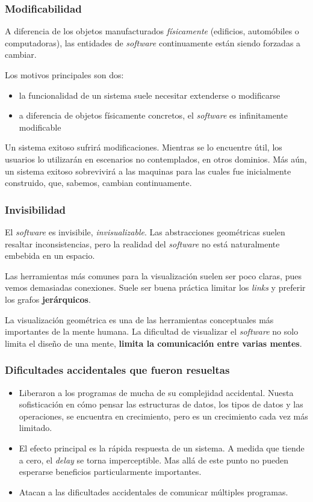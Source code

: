 \documentclass{beamer}
\begin{document}
\begin{frame}[fragile]
  \frametitle{Modificabilidad}
  A diferencia de los objetos manufacturados \textit{f\'isicamente} (edificios,
  autom\'obiles o computadoras), las entidades de \textit{software} continuamente
  est\'an siendo forzadas a cambiar.

  Los motivos principales son dos:
  \begin{itemize}
    \item la funcionalidad de un sistema suele necesitar extenderse o modificarse
    \item a diferencia de objetos f\'isicamente concretos, el \textit{software}
      es infinitamente modificable
  \end{itemize}

  Un sistema exitoso sufrir\'a modificaciones. Mientras se lo encuentre \'util,
  los usuarios lo utilizar\'an en escenarios no contemplados, en otros dominios.
  M\'as a\'un, un sistema exitoso sobrevivir\'a a las maquinas para las cuales
  fue inicialmente construido, que, sabemos, cambian continuamente.
\end{frame}


\begin{frame}[fragile]
  \frametitle{Invisibilidad}
  El \textit{software} es invisibile, \textit{invisualizable}.
  Las abstracciones geom\'etricas suelen resaltar inconsistencias, pero
  la realidad del \textit{software} no est\'a naturalmente embebida
  en un espacio.

  Las herramientas m\'as comunes para la visualizaci\'on suelen ser poco claras,
  pues vemos demasiadas conexiones. Suele ser buena pr\'actica limitar los
  \textit{links} y preferir los grafos \textbf{jer\'arquicos}.

  La visualizaci\'on geom\'etrica es una de las herramientas conceptuales m\'as
  importantes de la mente humana. La dificultad de visualizar el \textit{software}
  no solo limita el dise\~no de una mente, \textbf{limita la comunicaci\'on entre
  varias mentes}.
\end{frame}


\begin{frame}[fragile]
  \frametitle{Dificultades accidentales que fueron resueltas}

  \begin{itemize}
    \item[Lenguajes de alto nivel]
      Liberaron a los programas de mucha de su complejidad accidental.
      Nuesta sofisticaci\'on en c\'omo pensar las estructuras de datos, los tipos
      de datos y las operaciones, se encuentra en crecimiento, pero es un crecimiento
      cada vez m\'as limitado.
    \item[Tiempo compartido]
      El efecto principal es la r\'apida respuesta de un sistema. A medida que
      tiende a cero, el \textit{delay} se torna imperceptible. Mas all\'a de
      este punto no pueden esperarse beneficios particularmente importantes.
    \item[Ambientes de programaci\'on unificados]
      Atacan a las dificultades accidentales de comunicar m\'ultiples programas.
  \end{itemize}
\end{frame}
\end{document}
